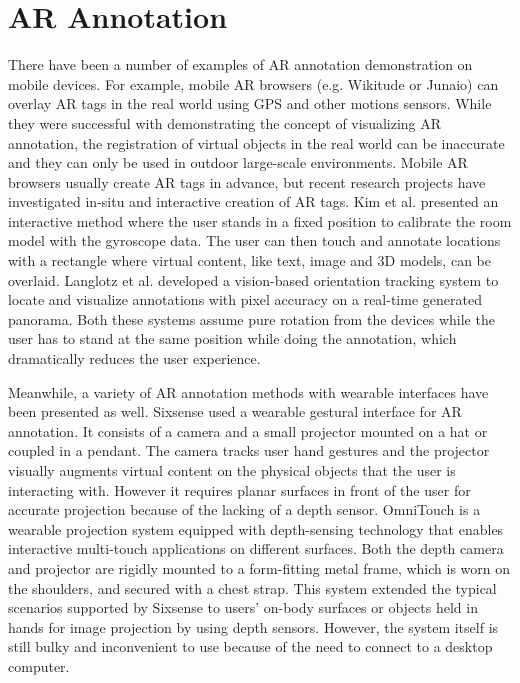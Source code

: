 \section{AR Annotation}

There have been a number of examples of AR annotation demonstration on mobile devices. For example, mobile AR browsers (e.g. Wikitude or Junaio) can overlay AR tags in the real world using  GPS and other motions sensors. While they were successful with demonstrating the concept of visualizing AR annotation, the registration of virtual objects in the real world can be inaccurate and they can only be used in outdoor large-scale environments. Mobile AR browsers usually create AR tags in advance, but recent research projects have investigated in-situ and interactive creation of AR tags. Kim et al. \cite{Kim:2011:IAS} presented an interactive method where the user stands in a fixed position to calibrate the room model with the gyroscope data. The user can then touch and annotate locations with a rectangle where virtual content, like text, image and 3D models, can be overlaid.  Langlotz et al. \cite{Langlotz:2012:OCP} developed a vision-based orientation tracking system to locate and visualize annotations with pixel accuracy on a real-time generated panorama. Both these systems assume pure rotation from the devices while the user has to stand at the same position while doing the annotation, which dramatically reduces the user experience.

Meanwhile, a variety of AR annotation methods with wearable interfaces have been presented as well. Sixsense \cite{Mistry:2009:WWU} used a wearable gestural interface for AR annotation. It consists of a camera and a small projector mounted on a hat or coupled in a pendant. The camera tracks user hand gestures and the projector visually augments virtual content on the physical objects that the user is interacting with. However it requires planar surfaces in front of the user for accurate projection because of the lacking of a depth sensor. OmniTouch \cite{Harrison:2011:OTW} is a wearable projection system equipped with depth-sensing technology that enables interactive multi-touch applications on different surfaces. Both the depth camera and projector are rigidly mounted to a form-fitting metal frame, which is worn on the shoulders, and secured with a chest strap. This system extended the typical scenarios supported by Sixsense to  users' on-body surfaces or objects held in hands for image projection by using depth sensors. However, the system itself is still bulky and inconvenient to use because of the need to connect to a desktop computer.

